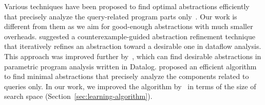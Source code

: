 Various techniques have been proposed to find optimal abstractions efficiently that precisely analyze the query-related program parts only~\cite{Zhang13,Zhang2014,Liang2011learning}.
Our work is different from them as we aim for good-enough abstractions with much smaller overheads.
\citet{Zhang13} suggested a counterexample-guided abstraction refinement technique that iteratively refines an abstraction toward a desirable one in dataflow analysis.
This approach was improved further by~\citet{Zhang2014}, which can find desirable abstractions in parametric program analysis written in Datalog.
\citet{Liang2011learning} proposed an efficient algorithm to find minimal abstractions that precisely analyze the components related to queries only.
In our work, we improved the algorithm by~\citet{Liang2011learning} in terms of the size of search space  (Section~\ref{sec:learning-algorithm}).








